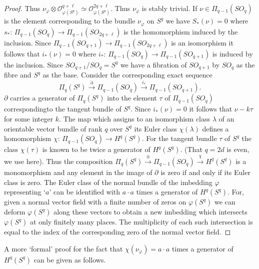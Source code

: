 \begin{proof}
Thus $\nu_\varphi \otimes \mathscr{O}^{q + \ell}_{\varphi (S^q)} \simeq
\mathscr{O}^{2q + \ell}_{\varphi (S^q)}$. Thus $\nu_\varphi$ is stably
trivial. If $\nu \in \Pi_{q-1} (SO_q)$ is the element
corresponding to the bundle $\nu_\varphi$ on $S^q$ we have $S_* (\nu)
= 0$ where $s_* $: $\Pi_{q-1} (SO_q ) \to \Pi_{q-1} (SO_{2q + \ell })$
is the homomorphism induced by the inclusion. Since
$\Pi_{q-1}(SO_{q+1}) \to \Pi_{q-1} (SO_{2q + \ell })$ is an
isomorphism it follows that $i_* (\nu) = 0$ where $i_*$: $\Pi_{q-1}
(SO_q) \to \Pi_{q-1} (SO_{q+1})$ is induced by the inclusion. Since
$SO_{q+1}/ SO_q = S^q$ we have a fibration of $SO_{q+1}$ by $SO_q$ as
the fibre and $S^q$ as the base. Consider the corresponding exact
sequence  
$$
\Pi_q (S^q) \xrightarrow{\partial} \Pi_{q-1} (SO_q) \xrightarrow{i_*}
\Pi_{q-1}(SO_{q+1}). 
$$ 
$\partial$ carries a generator of $\Pi_q (S^q)$ into the element
$\tau$ of $\Pi_{q-1}(SO_q)$ corresponding\pageoriginale to the tangent
bundle of $S^q$. Since $i_* (\nu) = 0$ it follows that $\nu-k \tau $
for some integer $k$. The map which assigns to an isomorphism class
$\lambda$ of an orientable vector bundle of rank $q$ over $S^q$ its
Euler class $\chi (\lambda)$ defines a homomorphism $\chi$: $\Pi_{q-1}
(SO_q) \to H^q (S^q)$. For the tangent bundle $\tau $ of $S^q$ the
class $\chi (\tau)$ is known to be twice a generator of $H^q
(S^q)$. (That $q = 2d$ is even, we use here). Thus the composition
$\Pi_q (S^q) \xrightarrow{\partial} \Pi_{q-1}(SO_q) \xrightarrow{\chi}
H^q (S^q)$ is a monomorphism and any element in the image of
$\partial$ is zero if and only if its Euler class is zero. The Euler
class of the normal bundle of the imbedding $\varphi$ representing
`$a$' can be identified with $a \cdot a$ times a generator of $H^q
(S^q)$. For, given a normal vector field with a finite number of zeros
on $\varphi (S^q)$ we can deform $\varphi (S^q)$ along these vectors
to obtain a new imbedding which intersects $\varphi (S^q)$ at only
finitely many places. The multiplicity of each such intersection is
equal to the index of the corresponding zero of the normal vector
field.  
\end{proof}

\begin{remark*}
A more `formal' proof for the fact that $\chi (\nu_\varphi) = a \cdot a$
times a generator of $H^q (S^q)$ can be given as follows. 
\end{remark*}

